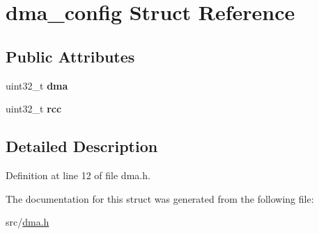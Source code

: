 \hypertarget{structdma__config}{}\section{dma\+\_\+config Struct Reference}
\label{structdma__config}
\subsection*{Public Attributes}
\begin{DoxyCompactItemize}
\item 
\hypertarget{structdma__config_a5a2895e50c0d073d7dc48e4cdee05b1d}{}uint32\+\_\+t {\bfseries dma}\label{structdma__config_a5a2895e50c0d073d7dc48e4cdee05b1d}

\item 
\hypertarget{structdma__config_aba8fd7114a6b26ab99e67c1b7bb8dd4e}{}uint32\+\_\+t {\bfseries rcc}\label{structdma__config_aba8fd7114a6b26ab99e67c1b7bb8dd4e}

\end{DoxyCompactItemize}


\subsection{Detailed Description}


Definition at line 12 of file dma.\+h.



The documentation for this struct was generated from the following file\+:\begin{DoxyCompactItemize}
\item 
src/\hyperlink{dma_8h}{dma.\+h}\end{DoxyCompactItemize}
